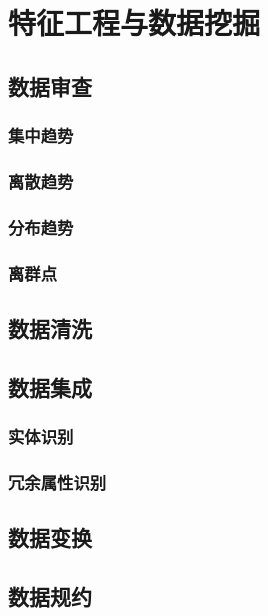 \chapter{特征工程与数据挖掘}
    \section{数据审查}
    \subsection{集中趋势}
    \subsection{离散趋势}
    \subsection{分布趋势}
    \subsection{离群点}
    \section{数据清洗}
    \section{数据集成}
    \subsection{实体识别}
    \subsection{冗余属性识别}
    \section{数据变换}
    \section{数据规约}